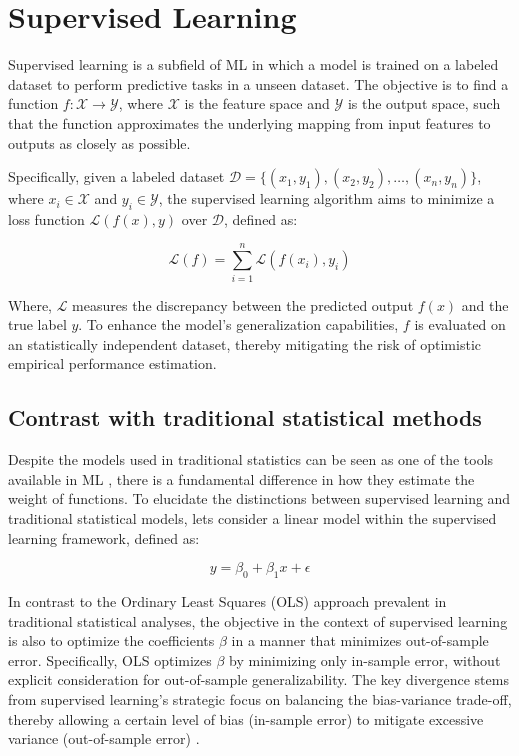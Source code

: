 \section{Supervised Learning }

Supervised learning is a subfield of ML in which a model is trained on a labeled dataset to perform predictive tasks in a unseen dataset. The objective is to find a function \( f: \mathcal{X} \rightarrow \mathcal{Y} \), where \( \mathcal{X} \) is the feature space and \( \mathcal{Y} \) is the output space, such that the function approximates the underlying mapping from input features to outputs as closely as possible.

Specifically, given a labeled dataset \( \mathcal{D} = \{ (x_1, y_1), (x_2, y_2), \ldots, (x_n, y_n) \} \), where \( x_i \in \mathcal{X} \) and \( y_i \in \mathcal{Y} \), the supervised learning algorithm aims to minimize a loss function \( \mathcal{L}(f(x), y) \) over \( \mathcal{D} \), defined as:

\[
\mathcal{L}(f) = \sum_{i=1}^{n} \mathcal{L}(f(x_i), y_i)
\]

Where, \( \mathcal{L} \) measures the discrepancy between the predicted output \( f(x) \) and the true label \( y \). To enhance the model's generalization capabilities, $f$ is evaluated on an statistically independent dataset, thereby mitigating the risk of optimistic empirical performance estimation.

\subsection{Contrast with traditional statistical methods}

Despite the models used in traditional statistics can be seen as one of the tools available in ML \cite{TrevorHastieRobertTibshirani2014AssessmentSelection}, there is a fundamental difference in how they estimate the weight of functions. To elucidate the distinctions between supervised learning and traditional statistical models, lets consider a linear model within the supervised learning framework, defined as:

\begin{equation}
y = \beta_0 + \beta_1 x + \epsilon
\label{lm}
\end{equation}

In contrast to the Ordinary Least Squares (OLS) approach prevalent in traditional statistical analyses, the objective in the context of supervised learning is also to optimize the coefficients $\beta$ in a manner that minimizes out-of-sample error. Specifically, OLS optimizes \( \beta \) by minimizing only in-sample error, without explicit consideration for out-of-sample generalizability. The key divergence stems from supervised learning's strategic focus on balancing the bias-variance trade-off, thereby allowing a certain level of bias (in-sample error) to mitigate excessive variance (out-of-sample error) \cite{Athey2019MachineAbout}.

